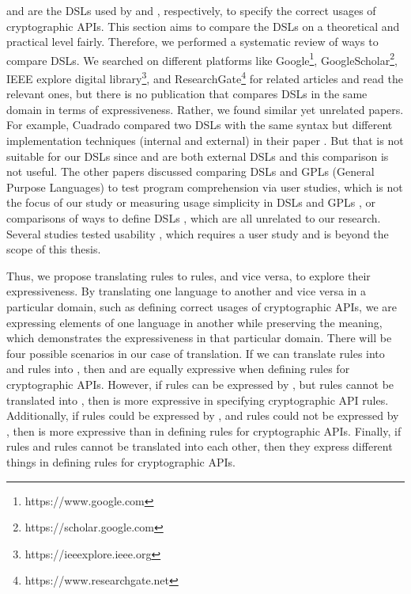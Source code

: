 \crysl{} \cite{skm19} and \MARK{} \cite{cod} are the DSLs used by \cognicryptsast{} \cite{skm19} and \codyze{} \cite{cod}, respectively, to specify the correct usages of cryptographic APIs. 
This section aims to compare the DSLs on a theoretical and practical level fairly. Therefore, we performed a systematic review \cite{systematic4} of ways to compare DSLs. We searched on different platforms like Google\footnote{https://www.google.com}, GoogleScholar\footnote{https://scholar.google.com}, IEEE explore digital library\footnote{https://ieeexplore.ieee.org}, and ResearchGate\footnote{https://www.researchgate.net} for related articles and read the relevant ones, but there is no publication that compares DSLs in the same domain in terms of expressiveness. Rather, we found similar yet unrelated papers. For example, Cuadrado \etal{} compared two DSLs with the same syntax but different implementation techniques (internal and external) in their paper \cite{evaldsl14}. But that is not suitable for our DSLs since \MARK{} and \crysl{} are both external DSLs and this comparison is not useful. The other papers discussed comparing DSLs and GPLs (General Purpose Languages) to test program comprehension via user studies, which is not the focus of our study \cite{dslvsgpl12} or measuring usage simplicity in DSLs and GPLs \cite{empdslvsgpl10}, or comparisons of ways to define DSLs \cite{comptext8}, which are all unrelated to our research. Several studies tested usability \cite{usabil12} \cite{usabledsl11} \cite{qualitydsl11} \cite{successfac09}, which requires a user study and is beyond the scope of this thesis.

Thus, we propose translating \crysl{} rules to \MARK{} rules, and vice versa, to explore their expressiveness.
By translating one language to another and vice versa in a particular domain, such as defining correct usages of cryptographic APIs, we are expressing elements of one language in another while preserving the meaning, which demonstrates the expressiveness in that particular domain. There will be four possible scenarios in our case of translation. If we can translate \MARK{} rules into \crysl{} and \crysl{} rules into \MARK, then \MARK{} and \crysl{} are equally expressive when defining rules for cryptographic APIs.	However, if \crysl{} rules can be expressed by \MARK, but \MARK{} rules cannot be translated into \crysl, then \MARK{} is more expressive in specifying cryptographic API rules. Additionally, if \MARK{} rules could be expressed by \crysl{}, and \crysl{} rules could not be expressed by \MARK{}, then \crysl{} is more expressive than \MARK{} in defining rules for cryptographic APIs. Finally, if \crysl{} rules and \MARK{} rules cannot be translated into each other, then they express different things in defining rules for cryptographic APIs. 


